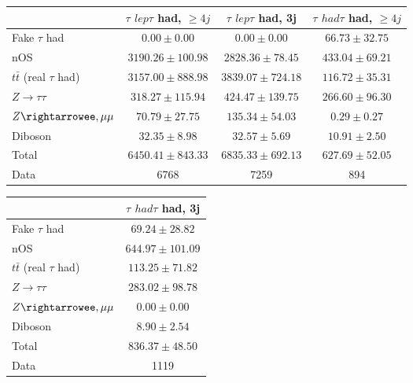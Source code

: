 \begin{table}
\begin{center}
  \begin{tabular}{ | l |  c |  c |  c | }
    \hline \hline 
     &  $\tau$ ${lep}\tau$ {had}, $\geq4j$  &  $\tau$ ${lep}\tau$ {had}, 3j  &  $\tau$ ${had}\tau$ {had}, $\geq4j$  \\ 
    \hline 
     Fake $\tau$ {had}  &   $ 0.00 \pm 0.00 $ &   $ 0.00 \pm 0.00 $ &   $ 66.73 \pm 32.75 $ \\ 
    nOS  &   $ 3190.26 \pm 100.98 $ &   $ 2828.36 \pm 78.45 $ &   $ 433.04 \pm 69.21 $ \\ 
     $t\bar{t}$ (real $\tau$ {had})  &   $ 3157.00 \pm 888.98 $ &   $ 3839.07 \pm 724.18 $ &   $ 116.72 \pm 35.31 $ \\ 
     $Z\rightarrow\tau\tau$  &   $ 318.27 \pm 115.94 $ &   $ 424.47 \pm 139.75 $ &   $ 266.60 \pm 96.30 $ \\ 
     $Z\rightarrowee,\mu\mu$  &   $ 70.79 \pm 27.75 $ &   $ 135.34 \pm 54.03 $ &   $ 0.29 \pm 0.27 $ \\ 
    Diboson  &   $ 32.35 \pm 8.98 $ &   $ 32.57 \pm 5.69 $ &   $ 10.91 \pm 2.50 $ \\ 
    Total  &   $ 6450.41 \pm 843.33 $ &   $ 6835.33 \pm 692.13 $ &   $ 627.69 \pm 52.05 $ \\ 
    \hline 
    Data  & 6768  & 7259  & 894  \\ 
    \hline \hline 
  \end{tabular} 


  \begin{tabular}{ | l |  c | }
    \hline \hline 
     &  $\tau$ ${had}\tau$ {had}, 3j  \\ 
    \hline 
     Fake $\tau$ {had}  &   $ 69.24 \pm 28.82 $ \\ 
    nOS  &   $ 644.97 \pm 101.09 $ \\ 
     $t\bar{t}$ (real $\tau$ {had})  &   $ 113.25 \pm 71.82 $ \\ 
     $Z\rightarrow\tau\tau$  &   $ 283.02 \pm 98.78 $ \\ 
     $Z\rightarrowee,\mu\mu$  &   $ 0.00 \pm 0.00 $ \\ 
    Diboson  &   $ 8.90 \pm 2.54 $ \\ 
    Total  &   $ 836.37 \pm 48.50 $ \\ 
    \hline 
    Data  & 1119  \\ 
    \hline \hline 
  \end{tabular} 


\end{center}
\end{table}
